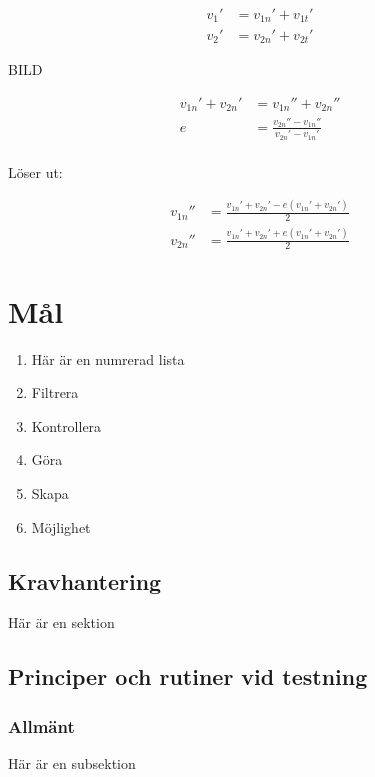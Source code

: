 \documentclass[11pt]{article} %
\begin{document}
 \begin{align}\label{vCollision}
v_1'& = v_{1n}' + v_{1t}'\\
v_2'& = v_{2n}' + v_{2t}'
 \end{align}

BILD

 \begin{align}\label{vCollision}
 v_{1n}' + v_{2n}'& = v_{1n}'' + v_{2n}''\\
 e& = \frac{v_{2n}''-v_{1n}''}{v_{2n}'-v_{1n}'}\\
 \end{align}

Löser ut: 

 \begin{align}\label{vCollision}
 v_{1n}''& = \frac{v_{1n}' + v_{2n}'  - e(v_{1n}' + v_{2n}')}{2} \\
 v_{2n}''& = \frac{v_{1n}' + v_{2n}'  + e(v_{1n}' + v_{2n}')}{2} 
 \end{align}




\section{Mål}



\begin{enumerate}
\item Här är en numrerad lista
\item Filtrera 
\item Kontrollera 
\item Göra 
\item Skapa 
\item Möjlighet 
\end{enumerate}


\pagebreak 



\subsection{Kravhantering}

Här är en sektion

\subsection{Principer och rutiner vid testning}

\subsubsection{Allmänt}
Här är en subsektion
\end{document}
